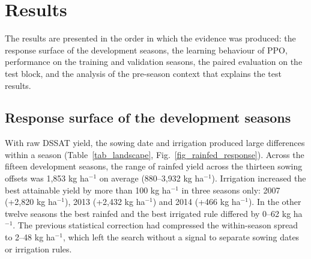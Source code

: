 \documentclass[times,final,authoryear]{elsarticle}
\begin{document}
\section{Results}
\label{resultados}

The results are presented in the order in which the evidence was produced: the response surface of the development seasons, the learning behaviour of PPO, performance on the training and validation seasons, the paired evaluation on the test block, and the analysis of the pre-season context that explains the test results.

\subsection{Response surface of the development seasons}
\label{subres_landscape}

With raw DSSAT yield, the sowing date and irrigation produced large differences within a season (Table~\ref{tab_landscape}, Fig.~\ref{fig_rainfed_response}). Across the fifteen development seasons, the range of rainfed yield across the thirteen sowing offsets was 1,853 kg ha$^{-1}$ on average (880--3,932 kg ha$^{-1}$). Irrigation increased the best attainable yield by more than 100 kg ha$^{-1}$ in three seasons only: 2007 (+2,820 kg ha$^{-1}$), 2013 (+2,432 kg ha$^{-1}$) and 2014 (+466 kg ha$^{-1}$). In the other twelve seasons the best rainfed and the best irrigated rule differed by 0--62 kg ha$^{-1}$. The previous statistical correction had compressed the within-season spread to 2--48 kg ha$^{-1}$, which left the search without a signal to separate sowing dates or irrigation rules.
\end{document}
